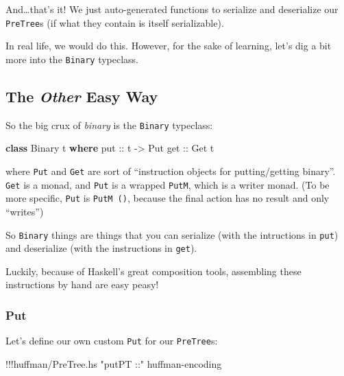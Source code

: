 \documentclass[]{article}
\newenvironment{Shaded}{}{}
\newcommand{\KeywordTok}[1]{\textcolor[rgb]{0.00,0.44,0.13}{\textbf{{#1}}}}
\newcommand{\DataTypeTok}[1]{\textcolor[rgb]{0.56,0.13,0.00}{{#1}}}
\newcommand{\StringTok}[1]{\textcolor[rgb]{0.25,0.44,0.63}{{#1}}}
\newcommand{\OtherTok}[1]{\textcolor[rgb]{0.00,0.44,0.13}{{#1}}}
\newcommand{\FunctionTok}[1]{\textcolor[rgb]{0.02,0.16,0.49}{{#1}}}
\newcommand{\NormalTok}[1]{{#1}}
\begin{document}
And\ldots{}that's it! We just auto-generated functions to serialize and
deserialize our \texttt{PreTree}s (if what they contain is itself
serializable).

In real life, we would do this. However, for the sake of learning, let's
dig a bit more into the \texttt{Binary} typeclass.

\subsection{\texorpdfstring{The \emph{Other} Easy
Way}{The Other Easy Way}}\label{the-other-easy-way}

So the big crux of \emph{binary} is the \texttt{Binary} typeclass:

\begin{Shaded}
\begin{Highlighting}[]
\KeywordTok{class} \DataTypeTok{Binary} \NormalTok{t }\KeywordTok{where}
\OtherTok{    put ::} \NormalTok{t }\OtherTok{->} \DataTypeTok{Put}
\OtherTok{    get ::} \DataTypeTok{Get} \NormalTok{t}
\end{Highlighting}
\end{Shaded}

where \texttt{Put} and \texttt{Get} are sort of ``instruction objects
for putting/getting binary''. \texttt{Get} is a monad, and \texttt{Put}
is a wrapped \texttt{PutM}, which is a writer monad. (To be more
specific, \texttt{Put} is \texttt{PutM\ ()}, because the final action
has no result and only ``writes'')

So \texttt{Binary} things are things that you can serialize (with the
intructions in \texttt{put}) and deserialize (with the instructions in
\texttt{get}).

Luckily, because of Haskell's great composition tools, assembling these
instructions by hand are easy peasy!

\subsubsection{Put}\label{put}

Let's define our own custom \texttt{Put} for our \texttt{PreTree}s:

\begin{Shaded}
\begin{Highlighting}[]
\FunctionTok{!!!}\NormalTok{huffman}\FunctionTok{/}\NormalTok{PreTree.hs }\StringTok{"putPT ::"} \NormalTok{huffman}\FunctionTok{-}\NormalTok{encoding}
\end{Highlighting}
\end{Shaded}
\end{document}
